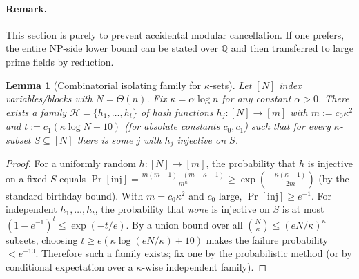\documentclass[12pt]{article}
\newtheorem{lemma}[theorem]{Lemma}
\theoremstyle{definition}
\theoremstyle{definition}
\theoremstyle{remark}
\theoremstyle{remark}
\begin{document}
\paragraph{Remark.}
This section is purely to prevent accidental modular cancellation.
If one prefers, the entire NP-side lower bound can be stated over $\mathbb{Q}$
and then transferred to large prime fields by reduction.


\begin{lemma}[Combinatorial isolating family for $\kappa$-sets]
\label{lem:splitter}
Let $[N]$ index variables/blocks with $N=\Theta(n)$. Fix $\kappa=\alpha\log n$ for any constant $\alpha>0$. There exists a family $\mathcal{H}=\{h_1,\ldots,h_t\}$ of hash functions $h_j:[N]\to[m]$ with $m:=c_0 \kappa^2$ and $t:=c_1(\kappa\log N+10)$ (for absolute constants $c_0,c_1$) such that for \emph{every} $\kappa$-subset $S\subseteq[N]$ there is some $j$ with $h_j$ injective on $S$.
\end{lemma}
\begin{proof}
For a uniformly random $h:[N]\to[m]$, the probability that $h$ is injective on a fixed $S$ equals
$\Pr[\mathrm{inj}]=\frac{m(m-1)\cdots(m-\kappa+1)}{m^\kappa}\ge \exp(-\tfrac{\kappa(\kappa-1)}{2m})$ (by the standard birthday bound).
With $m=c_0\kappa^2$ and $c_0$ large, $\Pr[\mathrm{inj}]\ge e^{-1}$.
For independent $h_1,\ldots,h_t$, the probability that \emph{none} is injective on $S$ is at most $(1-e^{-1})^t\le \exp(-t/e)$.
By a union bound over all $\binom{N}{\kappa}\le (eN/\kappa)^\kappa$ subsets, choosing $t\ge e(\kappa\log(eN/\kappa)+10)$ makes the failure probability $<e^{-10}$. Therefore such a family exists; fix one by the probabilistic method (or by conditional expectation over a $\kappa$-wise independent family).
\end{proof}

\end{document}
